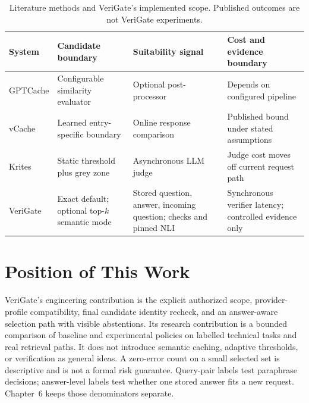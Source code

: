 \begin{table}[htbp]\centering\small
\caption{Literature methods and VeriGate's implemented scope. Published outcomes are not VeriGate experiments.}\label{tab:lit_comparison}
\begin{tabular}{p{2.1cm}p{3.1cm}p{3.4cm}p{3.5cm}}\toprule
System & Candidate boundary & Suitability signal & Cost and evidence boundary \\\midrule
GPTCache & Configurable similarity evaluator & Optional post-processor & Depends on configured pipeline \\
vCache & Learned entry-specific boundary & Online response comparison & Published bound under stated assumptions \\
Krites & Static threshold plus grey zone & Asynchronous LLM judge & Judge cost moves off current request path \\
VeriGate & Exact default; optional top-$k$ semantic mode & Stored question, answer, incoming question; checks and pinned NLI & Synchronous verifier latency; controlled evidence only \\\bottomrule
\end{tabular}
\end{table}

\section{Position of This Work}
VeriGate's engineering contribution is the explicit authorized scope, provider-profile compatibility, final candidate identity recheck, and an answer-aware selection path with visible abstentions. Its research contribution is a bounded comparison of baseline and experimental policies on labelled technical tasks and real retrieval paths. It does not introduce semantic caching, adaptive thresholds, or verification as general ideas. A zero-error count on a small selected set is descriptive and is not a formal risk guarantee. Query-pair labels test paraphrase decisions; answer-level labels test whether one stored answer fits a new request. Chapter~6 keeps those denominators separate.
